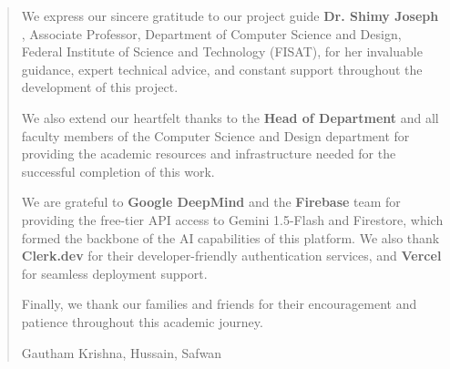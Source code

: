 \newpage
\renewcommand\abstractname{ACKNOWLEDGMENT}
\thispagestyle{plain}
\begin{abstract}
	\vspace{5cm}
	We express our sincere gratitude to our project guide \textbf{Dr. Shimy Joseph }, Associate Professor,
	Department of Computer Science and Design, Federal Institute of Science and Technology (FISAT),
	for her invaluable guidance, expert technical advice, and constant support throughout the
	development of this project.

	We also extend our heartfelt thanks to the \textbf{Head of Department} and all faculty members of
	the Computer Science and Design department for providing the academic resources and
	infrastructure needed for the successful completion of this work.

	We are grateful to \textbf{Google DeepMind} and the \textbf{Firebase} team for providing the
	free-tier API access to Gemini 1.5-Flash and Firestore, which formed the backbone of the
	AI capabilities of this platform. We also thank \textbf{Clerk.dev} for their developer-friendly
	authentication services, and \textbf{Vercel} for seamless deployment support.

	Finally, we thank our families and friends for their encouragement and patience throughout
	this academic journey.
	\vspace{1cm}
	\begin{flushright}
		 Gautham Krishna, Hussain, Safwan
	\end{flushright}
\end{abstract}
\newpage

\thispagestyle{empty}

\restoregeometry

\newpage

\thispagestyle{empty}

\setcounter{page}{0}

\tableofcontents

\thispagestyle{empty}

\newpage

\cleardoublepage


\thispagestyle{empty}


\listoffigures

\thispagestyle{empty}

\newpage

\cleardoublepage

